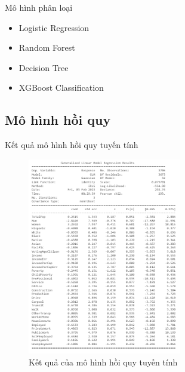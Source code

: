 \documentclass[10pt]{beamer}
\theoremstyle{remark}
\theoremstyle{definition}
\begin{document}
\begin{frame}{Mô hình phân loại}
	\begin{itemize}
        \item Logistic Regression
        \item Random Forest
        \item Decision Tree
        \item XGBoost Classification
    \end{itemize}
\end{frame}

\subsection{Mô hình hồi quy}

\begin{frame}{Kết quả mô hình hồi quy tuyến tính}
	\begin{figure}[h!]
        \centering
        \includegraphics[width=0.6\textwidth]{figures/GLM_Result.png}
        \caption{Kết quả của mô hình hồi quy tuyến tính}
    \end{figure}
\end{frame}
\end{document}
